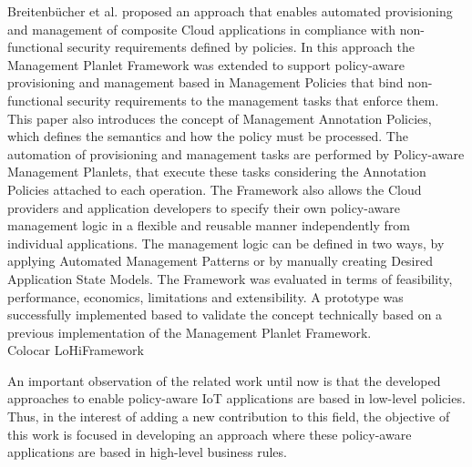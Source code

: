 Breitenb\"{u}cher et al. \cite{breitenbucher2014policy} proposed an approach that enables automated provisioning
and management of composite Cloud applications in compliance with non-functional security requirements defined by
policies. In this approach the Management Planlet Framework \cite{breitenbucher2013policy} was extended to support
policy-aware provisioning and management based in Management Policies that bind non-functional security requirements
to the management tasks that enforce them. This paper also introduces the concept of Management Annotation
Policies, which defines the semantics and how the policy must be processed. The automation of provisioning and
management tasks are performed by Policy-aware Management Planlets, that execute these tasks considering the
Annotation Policies attached to each operation. The Framework also allows the Cloud providers and application
developers to specify their own policy-aware management logic in a flexible and reusable manner independently
from individual applications. The management logic can be defined in two ways, by applying Automated Management
Patterns or by manually creating Desired Application State Models. The Framework was evaluated in terms of
feasibility, performance, economics, limitations and extensibility. A prototype was successfully implemented based
to validate the concept technically based on a previous implementation of the Management Planlet Framework.\\

Colocar LoHiFramework

An important observation of the related work until now is that the developed approaches to enable policy-aware
IoT applications are based in low-level policies. Thus, in the interest of adding a new contribution to this field,
the objective of this work is focused in developing an approach where these policy-aware applications are based in
high-level business rules.

